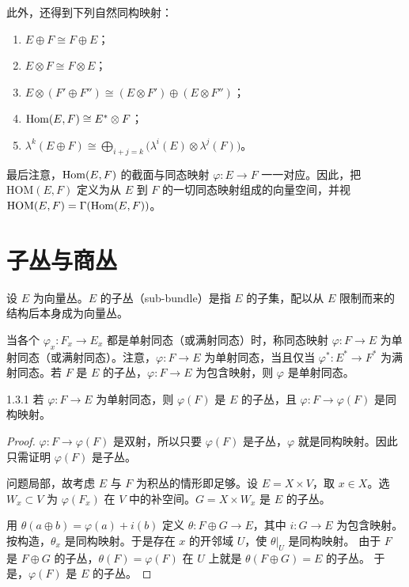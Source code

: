 此外，还得到下列自然同构映射：

\begin{enumerate}[label=(\roman*),leftmargin=2.4em,itemsep=2pt]
\item $E\oplus F\cong F\oplus E$；
\item $E\otimes F\cong F\otimes E$；
\item $E\otimes(F'\oplus F'')\cong(E\otimes F')\oplus(E\otimes F'')$；
\item $\operatorname{Hom}(E,F)\cong E^*\otimes F$；
\item $\displaystyle\lambda^k(E\oplus F)\cong\bigoplus_{i+j=k}\bigl(\lambda^i(E)\otimes\lambda^j(F)\bigr)$。
\end{enumerate}

最后注意，$\operatorname{Hom}(E,F)$ 的截面与同态映射 $\varphi\colon E\to F$ 一一对应。因此，把 $\mathrm{HOM}(E,F)$ 定义为从 $E$ 到 $F$ 的一切同态映射组成的向量空间，并视 $\mathrm{HOM}(E,F)=\Gamma(\operatorname{Hom}(E,F))$。

\section{子丛与商丛}

设 $E$ 为向量丛。$E$ 的子丛（sub-bundle）是指 $E$ 的子集，配以从 $E$ 限制而来的结构后本身成为向量丛。

当各个 $\varphi_x\colon F_x\to E_x$ 都是单射同态（或满射同态）时，称同态映射 $\varphi\colon F\to E$ 为单射同态（或满射同态）。注意，$\varphi\colon F\to E$ 为单射同态，当且仅当 $\varphi^*\colon E^*\to F^*$ 为满射同态。若 $F$ 是 $E$ 的子丛，$\varphi\colon F\to E$ 为包含映射，则 $\varphi$ 是单射同态。

\begin{lemma*}{1.3.1}
  若 $\varphi\colon F\to E$ 为单射同态，则 $\varphi(F)$ 是 $E$ 的子丛，且 $\varphi\colon F\to\varphi(F)$ 是同构映射。
\end{lemma*}

\begin{proof}
  $\varphi\colon F\to\varphi(F)$ 是双射，所以只要 $\varphi(F)$ 是子丛，$\varphi$ 就是同构映射。因此只需证明 $\varphi(F)$ 是子丛。

  问题局部，故考虑 $E$ 与 $F$ 为积丛的情形即足够。设 $E=X\times V$，取 $x\in X$。选 $W_x\subset V$ 为 $\varphi(F_x)$ 在 $V$ 中的补空间。$G=X\times W_x$ 是 $E$ 的子丛。

  用 $\theta(a\oplus b)=\varphi(a)+i(b)$ 定义 $\theta\colon F\oplus G\to E$，其中 $i\colon G\to E$ 为包含映射。按构造，$\theta_x$ 是同构映射。于是存在 $x$ 的开邻域 $U$，使 $\theta|_U$ 是同构映射。%
  由于 $F$ 是 $F\oplus G$ 的子丛，$\theta(F)=\varphi(F)$ 在 $U$ 上就是 $\theta(F\oplus G)=E$ 的子丛。
  于是，$\varphi(F)$ 是 $E$ 的子丛。
\end{proof}

